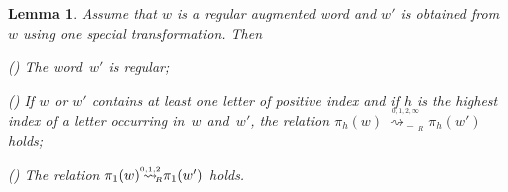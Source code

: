 \documentclass{amsart}
\numberwithin{equation}{section}
\theoremstyle{plain}
\newtheorem{lemm}[prop]{Lemma}
\theoremstyle{definition}
\newcounter{ITEM}
\begin{document}
\begin{lemm}
\label{L:BasicStep}
Assume that ${w}$ is a regular augmented word and ${w}'$ is obtained from~${w}$ using one special transformation. Then

{\setcounter{ITEM}{1}\leavevmode\hbox{\rm()}} The word~${w}'$ is regular;

{\setcounter{ITEM}{2}\leavevmode\hbox{\rm()}} If ${w}$ or ${w}'$ contains at least one letter of positive index and if ${h}$ is the highest index of a letter occurring in~${w}$ and~${w}'$, the relation $\pi_{h}({w}) {\mathrel{\overset{{}_{{0,1,2, \infty}}}{\ \rightsquigarrow_{\!\!\!\!\!\!-\,{{\!{}_{R}}}}}}} \pi_{h}({w}')$ holds;

{\setcounter{ITEM}{3}\leavevmode\hbox{\rm()}} The relation $\pi_1({w}) {\mathrel{{\mathrel{\overset{\scriptscriptstyle 0,1,2}{\rightsquigarrow}}}_{\hspace{-0.9ex}{\scriptscriptstyle R}}}} \pi_1({w}')$ holds.
\end{lemm}
\end{document}
